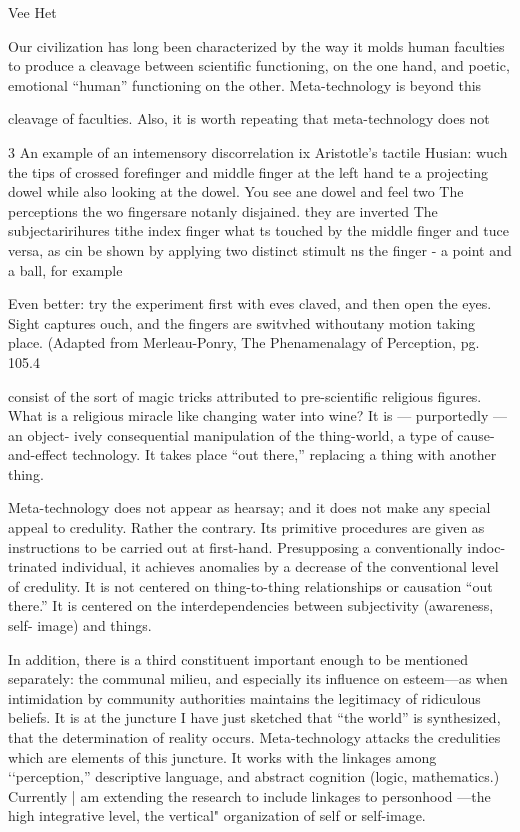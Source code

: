 Vee Het 


Our civilization has long been characterized by the way it molds human faculties 
to produce a cleavage between scientific functioning, on the one hand, and poetic, 
emotional “human” functioning on the other. Meta-technology is beyond this 


cleavage of faculties. Also, it is worth repeating that meta-technology does not 


3 An example of an intemensory discorrelation ix Aristotle's tactile Husian: wuch the tips of crossed forefinger 
and middle finger at the left hand te a projecting dowel while also looking at the dowel. You see ane dowel and feel 
two The perceptions the wo fingersare notanly disjained. they are inverted The subjectaririhures tithe index finger 
what ts touched by the middle finger and tuce versa, as cin be shown by applying two distinct stimult ns the finger - 
a point and a ball, for example 

Even better: try the experiment first with eves claved, and then open the eyes. Sight captures ouch, and the fingers 
are switvhed withoutany motion taking place. (Adapted from Merleau-Ponry, The Phenamenalagy of Perception, pg. 105.4 


consist of the sort of magic tricks attributed to pre-scientific religious figures. What 
is a religious miracle like changing water into wine? It is — purportedly —an object- 
ively consequential manipulation of the thing-world, a type of cause-and-effect 
technology. It takes place “out there,” replacing a thing with another thing. 

Meta-technology does not appear as hearsay; and it does not make any special 
appeal to credulity. Rather the contrary. Its primitive procedures are given as 
instructions to be carried out at first-hand. Presupposing a conventionally indoc- 
trinated individual, it achieves anomalies by a decrease of the conventional level of 
credulity. It is not centered on thing-to-thing relationships or causation “out there.” 
It is centered on the interdependencies between subjectivity (awareness, self- 
image) and things. 

In addition, there is a third constituent important enough to be mentioned 
separately: the communal milieu, and especially its influence on esteem—as when 
intimidation by community authorities maintains the legitimacy of ridiculous 
beliefs. It is at the juncture I have just sketched that “the world” is synthesized, that 
the determination of reality occurs. Meta-technology attacks the credulities which are 
elements of this juncture. It works with the linkages among ‘‘perception,” descriptive 
language, and abstract cognition (logic, mathematics.) Currently | am extending the 
research to include linkages to personhood —the high integrative level, the vertical" 
organization of self or self-image. 

